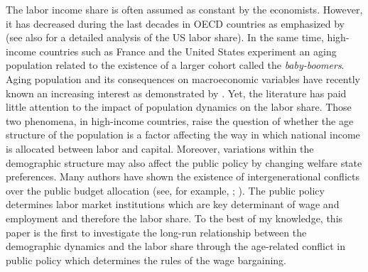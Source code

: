 

The labor income share is often assumed as constant by the economists. However, it has decreased during the last decades in OECD countries as emphasized by \cite{Karabarbounis2014} (see also \citealt{Elsby2013} for a detailed analysis of the US labor share).
In the same time, high-income countries such as France and the United States experiment an aging population related to the existence of a larger cohort called the \textit{baby-boomers}. Aging population and its consequences on macroeconomic variables have recently known an increasing interest as demonstrated by \cite{Sheiner2014}.
Yet, the literature has paid little attention to the impact of population dynamics on the labor share. Those two phenomena, in high-income countries, raise the question of whether the age structure of the population is a factor affecting the way in which national income is allocated between labor and capital.
Moreover, variations within the demographic structure may also affect the public policy by changing welfare state preferences. Many authors have shown the existence of intergenerational conflicts over the public budget allocation (see, for example, \citealt{Busemeyer2009}; \citealt{Sorensen2013}). The public policy determines labor market institutions which are key determinant of wage and employment and therefore the labor share.
To the best of my knowledge, this paper is the first to investigate the long-run relationship between the demographic dynamics and the labor share through the age-related conflict in public policy which determines the rules of the wage bargaining.



